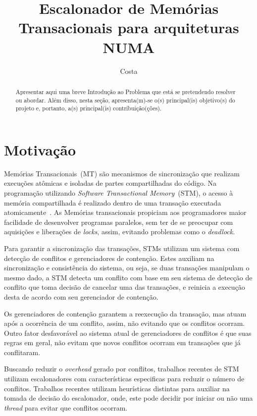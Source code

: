 \documentclass[diss-proposta,nocipinfo]{texufpel}
\title{Escalonador de Memórias Transacionais para arquiteturas NUMA}
\author{Costa}{Michael Alexandre}
\begin{document}
\maketitle
\sloppy

\begin{abstract}
  Apresentar aqui uma breve Introdução ao Problema que está se
  pretendendo resolver ou abordar. Além disso, nesta seção,
  apresenta(m)-se o(s) principal(is) objetivo(s) do projeto e,
  portanto, a(s) principal(is) contribuição(ções).
\end{abstract}

\chapter{Motivação}

Memórias Transacionais~(MT) são mecanismos de sincronização que realizam execuções atômicas e isoladas de partes compartilhadas do código. Na programação utilizando \emph{Software Transactional Memory}~(STM), o acesso à memória compartilhada é realizado dentro de uma transação executada atomicamente~\cite{teixeira15}. As Memórias transacionais propiciam aos programadores maior facilidade de desenvolver programas paralelos, sem ter de se preocupar com aquisições e liberações de \emph{locks}, assim, evitando problemas como o \emph{deadlock}.

Para garantir a sincronização das transações, STMs utilizam um sistema com detecção de conflitos e gerenciadores de contenção. Estes auxiliam na sincronização e consistência do sistema, ou seja, se duas transações manipulam o mesmo dado, a STM detecta um conflito com base em seu sistema de detecção de conflito que toma decisão de cancelar uma das transações, e reinicia a execução desta de acordo com seu gerenciador de contenção.

Os gerenciadores de contenção garantem a reexecução da transação, mas atuam após a ocorrência de um conflito, assim, não evitando que os conflitos ocorram. Outro fator desfavorável ao sistema atual de gerenciadores de conflitos é que suas regras em geral, não evitam que novos conflitos ocorram em transações que já conflitaram.

Buscando reduzir o \emph{overhead} gerado por conflitos, trabalhos recentes de STM utilizam escalonadores com características especificas para reduzir o número de conflitos. Trabalhos recentes utilizam heurísticas distintas para auxiliar na tomada de decisão do escalonador, onde, este pode decidir por iniciar ou não uma \emph{thread} para evitar que conflitos ocorram.
\end{document}
